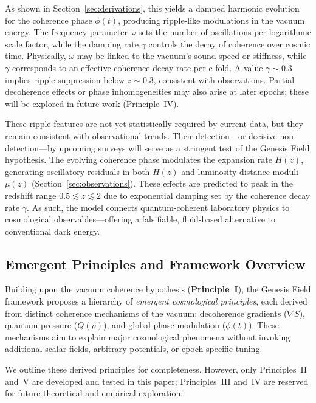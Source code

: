 As shown in Section~\ref{sec:derivations}, this yields a damped harmonic evolution for the coherence phase \( \phi(t) \), producing ripple-like modulations in the vacuum energy. The frequency parameter \( \omega \) sets the number of oscillations per logarithmic scale factor, while the damping rate \( \gamma \) controls the decay of coherence over cosmic time. Physically, \( \omega \) may be linked to the vacuum’s sound speed or stiffness, while \( \gamma \) corresponds to an effective coherence decay rate per e-fold. A value \( \gamma \sim 0.3 \) implies ripple suppression below \( z \sim 0.3 \), consistent with observations. Partial decoherence effects or phase inhomogeneities may also arise at later epochs; these will be explored in future work (Principle~IV).

These ripple features are not yet statistically required by current data, but they remain consistent with observational trends. Their detection—or decisive non-detection—by upcoming surveys will serve as a stringent test of the Genesis Field hypothesis. The evolving coherence phase modulates the expansion rate \( H(z) \), generating oscillatory residuals in both \( H(z) \) and luminosity distance moduli \( \mu(z) \) (Section~\ref{sec:observations}). These effects are predicted to peak in the redshift range \( 0.5 \lesssim z \lesssim 2 \) due to exponential damping set by the coherence decay rate \( \gamma \). As such, the model connects quantum-coherent laboratory physics to cosmological observables—offering a falsifiable, fluid-based alternative to conventional dark energy.

\subsection{Emergent Principles and Framework Overview}
\label{sec:derived_principles}

Building upon the vacuum coherence hypothesis (\textbf{Principle~I}), the Genesis Field framework proposes a hierarchy of \emph{emergent cosmological principles}, each derived from distinct coherence mechanisms of the vacuum: decoherence gradients (\( \nabla S \)), quantum pressure (\( Q(\rho) \)), and global phase modulation (\( \phi(t) \)). These mechanisms aim to explain major cosmological phenomena without invoking additional scalar fields, arbitrary potentials, or epoch-specific tuning.

We outline these derived principles for completeness. However, only Principles~II and~V are developed and tested in this paper; Principles~III and~IV are reserved for future theoretical and empirical exploration:

